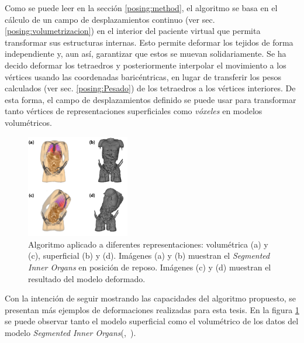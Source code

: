 Como se puede leer en la sección 
\ref{posing:method}, el algoritmo se basa en el cálculo de un campo de desplazamientos continuo (ver sec. \ref{posing:volumetrizacion}) %
en el interior del paciente virtual que permita transformar sus estructuras internas. Esto permite deformar los tejidos de forma independiente y, aun así, garantizar que estos se muevan solidariamente. Se ha decido deformar los tetraedros y posteriormente interpolar el movimiento a los vértices usando las coordenadas baricéntricas, en lugar de transferir los pesos calculados (ver sec. \ref{posing:Pesado}) de los tetraedros a los vértices interiores. 
De esta forma, el campo de desplazamientos definido se puede usar para transformar tanto vértices de representaciones superficiales como \emph{vóxeles} en modelos volumétricos. 


%


\begin{figure}[!ht]%
   \centering
   \includegraphics[width=0.4\textwidth]{IMG/HV}
    \caption{Algoritmo aplicado a diferentes representaciones: volumétrica (a) y (c), superficial (b) y (d). Imágenes (a) y (b) muestran el \emph{Segmented Inner Organs} en posición de reposo. Imágenes (c) y (d) muestran el resultado del modelo deformado.}
    \label{fig:humanvisible}
\end{figure}
Con la intención de seguir mostrando las capacidades del algoritmo propuesto, se presentan más ejemplos de deformaciones realizadas para esta tesis. En la figura \ref{fig:humanvisible} se puede observar tanto el modelo superficial como el volumétrico de los datos del modelo \emph{Segmented Inner Organs}(\cite{VM2002},~\cite{VoxelMan}).



